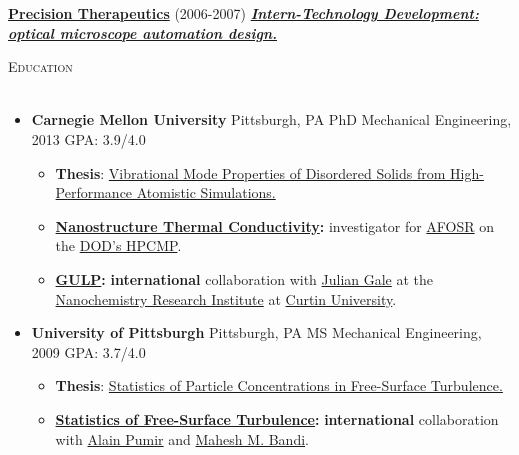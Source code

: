 \documentclass{article}
\newcommand{\area}[2]{\vspace*{-9pt} \begin{verse}\textbf{#1}   #2 \end{verse}  }
\newcommand{\lineunder}{\vspace*{-8pt} \\ \hspace*{-18pt} \hrulefill \\}
\newcommand{\header}[1]{{\hspace*{-15pt}\vspace*{6pt} \textsc{#1}} \vspace*{-6pt} \lineunder}
\newcommand{\employer}[3]{{ \textbf{#1} (#2) \underline{\textbf{\emph{#3}}}\\  }}
\newenvironment{achievements}{\begin{list}{$\bullet$}{\topsep 0pt \itemsep -2pt}}{\vspace*{4pt}\end{list}}
\newcommand{\schoolwithcourses}[3]{
 \textbf{#1} #2 $\bullet$ #3\\ 
\vspace*{5pt}
}
\begin{document}
\employer{\href{http://www.precisiontherapeutics.com/}{Precision Therapeutics}}{2006-2007}{Intern-Technology Development: optical microscope automation design.} 

\header{\large{Education}}

\begin{itemize}[leftmargin=*]
  \item \textbf{Carnegie Mellon University} Pittsburgh, PA PhD Mechanical Engineering, 2013 GPA: 3.9/4.0
  \begin{itemize}
    \item \textbf{Thesis}: \href{http://jasonlarkin.github.io/projects-phd.html}
    {Vibrational Mode Properties of Disordered Solids from High-Performance Atomistic Simulations.}
    \item \textbf{\href{http://ntpl.me.cmu.edu/research.html}{Nanostructure Thermal Conductivity}:} investigator for  
\href{http://www.wpafb.af.mil/afrl/afosr/}{AFOSR} on the \href{http://www.hpcmo.hpc.mil/cms2/index.php}{DOD's HPCMP}.
    \item \textbf{\href{https://nanochemistry.curtin.edu.au/local/docs/gulp/gulp4.2_manual.pdf}{GULP}:} \textbf{international} collaboration with \href{http://nanochemistry.curtin.edu.au/people/staff.cfm/J.Gale}{Julian Gale} at the 
\href{http://nanochemistry.curtin.edu.au/}{Nanochemistry Research Institute} at \href{http://www.curtin.edu.au/}{Curtin University}.
  \end{itemize}

  \item \textbf{University of Pittsburgh} Pittsburgh, PA MS Mechanical Engineering, 2009 GPA: 3.7/4.0
  \begin{itemize}
    \item \textbf{Thesis}: \href{http://jasonlarkin.github.io/projects-ms.html}{Statistics of Particle Concentrations in Free-Surface Turbulence.} 
    \item \textbf{\href{http://jasonlarkin.github.io/projects-ms.html}{Statistics of Free-Surface Turbulence}:} \textbf{international} collaboration with \href{http://perso.ens-lyon.fr/alain.pumir/Pumir_webpage.html}{Alain Pumir} and \href{https://groups.oist.jp/ciu/mahesh-m-bandi}{Mahesh M. Bandi}. 
  \end{itemize}


\end{itemize}
\end{document}
